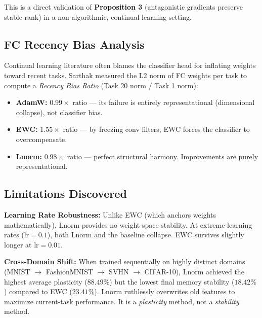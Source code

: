 \documentclass[11pt,a4paper]{article}
\begin{document}
This is a direct validation of \textbf{Proposition 3} (antagonistic gradients preserve stable rank) in a non-algorithmic, continual learning setting.

\subsection{FC Recency Bias Analysis}

Continual learning literature often blames the classifier head for inflating weights toward recent tasks. Sarthak measured the L2 norm of FC weights per task to compute a \emph{Recency Bias Ratio} (Task 20 norm / Task 1 norm):

\begin{itemize}
    \item \textbf{AdamW:} $0.99\times$ ratio --- its failure is entirely representational (dimensional collapse), not classifier bias.
    \item \textbf{EWC:} $1.55\times$ ratio --- by freezing conv filters, EWC forces the classifier to overcompensate.
    \item \textbf{Lnorm:} $0.98\times$ ratio --- perfect structural harmony. Improvements are purely representational.
\end{itemize}

\subsection{Limitations Discovered}

\textbf{Learning Rate Robustness:} Unlike EWC (which anchors weights mathematically), Lnorm provides no weight-space stability. At extreme learning rates ($\text{lr} = 0.1$), both Lnorm and the baseline collapse. EWC survives slightly longer at $\text{lr} = 0.01$.

\textbf{Cross-Domain Shift:} When trained sequentially on highly distinct domains (MNIST $\to$ FashionMNIST $\to$ SVHN $\to$ CIFAR-10), Lnorm achieved the highest average plasticity ($88.49\%$) but the lowest final memory stability ($18.42\%$) compared to EWC ($23.41\%$). Lnorm ruthlessly overwrites old features to maximize current-task performance. It is a \emph{plasticity} method, not a \emph{stability} method.

\newpage

\end{document}
